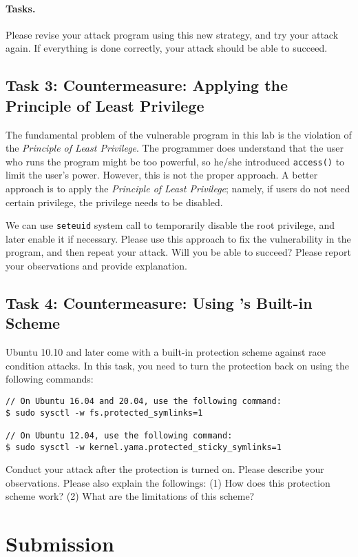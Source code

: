 \paragraph{Tasks.} Please revise your attack program using 
this new strategy, and try your attack again. If everything 
is done correctly, your attack should be able to succeed. 



\subsection{Task 3: Countermeasure: Applying the Principle of Least Privilege}

The fundamental problem of the vulnerable program in this lab is 
the violation of the {\em Principle of Least Privilege}. 
The programmer does understand that the user who runs the program 
might be too powerful, so he/she introduced {\tt access()} to limit the user's 
power. However, this is not the proper approach. A better
approach is to apply the {\em Principle of Least Privilege}; 
namely, if users do not need certain privilege, the privilege
needs to be disabled.

We can use {\tt seteuid{}} system call to temporarily disable
the root privilege, and later enable it if necessary. Please use 
this approach to fix the vulnerability in the program, and then
repeat your attack. Will you be able to succeed? Please report your
observations and provide explanation.



\subsection{Task 4: Countermeasure: Using \ubuntu's Built-in Scheme}

Ubuntu 10.10 and later come with a built-in protection scheme against race condition
attacks. In this task, you need to turn the protection back on using the
following commands:

\begin{lstlisting}
// On Ubuntu 16.04 and 20.04, use the following command:
$ sudo sysctl -w fs.protected_symlinks=1

// On Ubuntu 12.04, use the following command:
$ sudo sysctl -w kernel.yama.protected_sticky_symlinks=1
\end{lstlisting}

Conduct your attack after the protection is turned on.  
Please describe your observations. Please also explain
the followings: (1) How does this protection scheme work?
(2) What are the limitations of this scheme?






\section{Submission}





